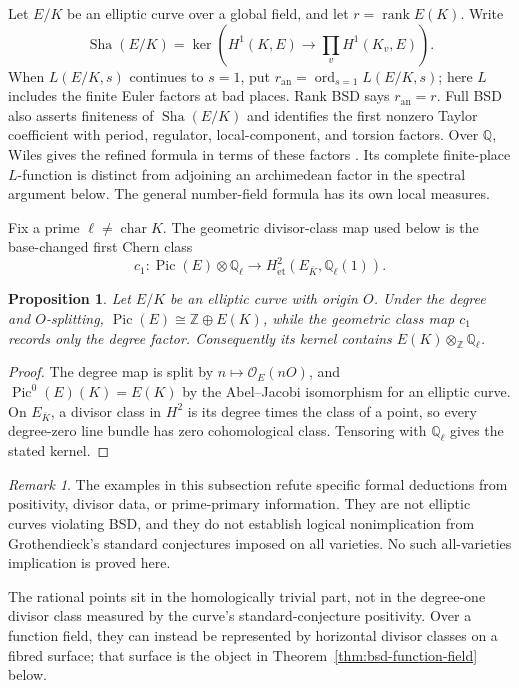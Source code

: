 \documentclass[11pt]{amsart}
\theoremstyle{plain}
\newtheorem{proposition}[theorem]{Proposition}
\theoremstyle{definition}
\theoremstyle{remark}
\newtheorem{remark}[theorem]{Remark}
\numberwithin{equation}{section}
\newcommand{\Q}{\mathbb{Q}}
\newcommand{\Z}{\mathbb{Z}}
\DeclareMathOperator{\ord}{ord}
\newcommand{\Sha}{\operatorname{Sha}}
\begin{document}
Let $E/K$ be an elliptic curve over a global field, and let
$r=\operatorname{rank}E(K)$. Write
\[
 \Sha(E/K)=\ker\!\left(H^1(K,E)\longrightarrow
                  \prod_v H^1(K_v,E)\right).
\]
When $L(E/K,s)$
continues to $s=1$, put $r_{\mathrm{an}}=\ord_{s=1}L(E/K,s)$; here $L$
includes the finite Euler factors at bad places.
Rank BSD says $r_{\mathrm{an}}=r$. Full BSD also asserts finiteness of
$\Sha(E/K)$ and identifies the first nonzero Taylor coefficient with
period, regulator, local-component, and torsion factors. Over $\Q$,
Wiles gives the refined formula in terms of these factors
\cite[p.~2, Remark~1]{Wiles2000BSD}. Its complete finite-place
$L$-function is distinct from adjoining an archimedean factor in the
spectral argument below. The general number-field formula has its
own local measures.

Fix a prime $\ell\ne\operatorname{char}K$. The geometric divisor-class
map used below is the base-changed first Chern class
\[
 c_1:\operatorname{Pic}(E)\otimes\Q_\ell\longrightarrow
 H^2_{\mathrm{\acute et}}(E_{\overline K},\Q_\ell(1)).
\]

\begin{proposition}\label{prop:bsd-picard-gap}
Let $E/K$ be an elliptic curve with origin $O$. Under the degree and
$O$-splitting, $\operatorname{Pic}(E)\cong\Z\oplus E(K)$, while the
geometric class map $c_1$ records only the degree factor. Consequently
its kernel contains $E(K)\otimes_\Z\Q_\ell$.
\end{proposition}
\begin{proof}
The degree map is split by $n\mapsto\mathcal O_E(nO)$, and
$\operatorname{Pic}^0(E)(K)=E(K)$ by the Abel--Jacobi isomorphism for an
elliptic curve. On $E_{\overline K}$, a divisor class in $H^2$ is its
degree times the class of a point, so every degree-zero line bundle
has zero cohomological class. Tensoring with $\Q_\ell$ gives the stated
kernel.
\end{proof}

\begin{remark}\label{rem:bsd-implication-status}
The examples in this subsection refute specific formal deductions from
positivity, divisor data, or prime-primary information. They are not
elliptic curves violating BSD, and they do not establish logical
nonimplication from Grothendieck's standard conjectures imposed on all
varieties. No such all-varieties implication is proved here.
\end{remark}

The rational points sit in the homologically trivial part, not in the
degree-one divisor class measured by the curve's standard-conjecture
positivity. Over a function field, they can instead be represented by
horizontal divisor classes on a fibred surface; that surface is the
object in Theorem~\ref{thm:bsd-function-field} below.
\end{document}
